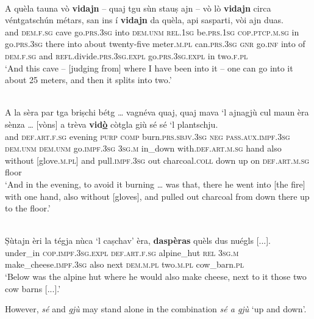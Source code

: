 \ea
\label{}
\\
\gll A quèla tauna vò \textbf{vidajn} – quaj tgu sùn stauṣ ajn – vò lò \textbf{vidajn} circa véntgatschún métars, san ins í \textbf{vidajn} da quèla, api sasparti, vòi ajn duas.\\
and \textsc{dem.f.sg} cave go.\textsc{prs.3sg} into {}  \textsc{dem.unm} \textsc{rel.1sg} be.\textsc{prs.1sg} \textsc{cop.ptcp.m.sg} in {} go.\textsc{prs.3sg} there into about twenty-five meter.\textsc{m.pl} can.\textsc{prs.3sg} \textsc{gnr} go.\textsc{inf} into of \textsc{dem.f.sg} and \textsc{refl}.divide.\textsc{prs.3sg.expl} go.\textsc{prs.3sg.expl} in two.\textsc{f.pl}  \\
\glt `And this cave – [judging from] where I have been into it – one can go into it about 25 meters, and then it splits into two.'
\z

\ea
\label{}
\\
\gll  A la sèra par tga briṣchi bétg … vagnéva quaj, quaj mava `l ajnagjù cul maun èra sènza … [vòns] a trèva \textbf{vid\underline{ò}} còtgla giù sé sé  `l plantschju.  \\
and \textsc{def.art.f.sg} evening \textsc{purp} \textsc{comp} burn.\textsc{prs.sbjv.3sg} \textsc{neg} {} \textsc{pass.aux.impf.3sg} \textsc{dem.unm} \textsc{dem.unm} go.\textsc{impf.3sg} \textsc{3sg.m} in\_down with.\textsc{def.art.m.sg} hand also without {} [glove.\textsc{m.pl}] and pull.\textsc{impf.3sg} out charcoal.\textsc{coll} down up on \textsc{def.art.m.sg} floor  \\
\glt `And in the evening, to avoid it burning … was that, there he went into [the fire] with one hand, also without [gloves], and pulled out charcoal from down there up to the floor.'
\z

\ea
\label{}
\\
\gll Ṣùtajn èri la tégja nùca `l caṣchav' èra, \textbf{daspèras} quèls dus nuégls [...].\\
under\_in \textsc{cop.impf.3sg.expl} \textsc{def.art.f.sg} alpine\_hut \textsc{rel} \textsc{3sg.m} make\_cheese.\textsc{impf.3sg} also next \textsc{dem.m.pl} two.\textsc{m.pl} cow\_barn.\textsc{pl} \\
\glt `Below was the alpine hut where he would also make cheese, next to it those two cow barns [...].'
\z

However, \textit{sé} and \textit{gjù} may stand alone in the combination \textit{sé a gjù} `up and down'.

